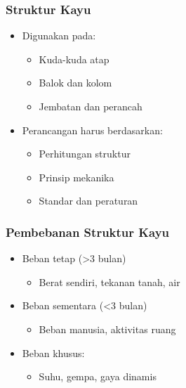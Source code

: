 \documentclass[../main.tex]{subfiles}
\begin{document}
\begin{frame}[mytitle=standard,t,mybg=bglight3,light]
	\frametitle{Struktur Kayu}
	\begin{itemize}
		\item Digunakan pada:
		      \begin{itemize}
			      \item Kuda-kuda atap
			      \item Balok dan kolom
			      \item Jembatan dan perancah
		      \end{itemize}
		\item Perancangan harus berdasarkan:
		      \begin{itemize}
			      \item Perhitungan struktur
			      \item Prinsip mekanika
			      \item Standar dan peraturan
		      \end{itemize}
	\end{itemize}\end{frame}

\begin{frame}[mytitle=standard,t,mycolor=digiPH_uniblue,light]\frametitle{Pembebanan Struktur Kayu}
	\begin{itemize}
		\item Beban tetap (>3 bulan)
		      \begin{itemize}
			      \item Berat sendiri, tekanan tanah, air
		      \end{itemize}
		\item Beban sementara (<3 bulan)
		      \begin{itemize}
			      \item Beban manusia, aktivitas ruang
		      \end{itemize}
		\item Beban khusus:
		      \begin{itemize}
			      \item Suhu, gempa, gaya dinamis
		      \end{itemize}
	\end{itemize}\end{frame}
\end{document}
